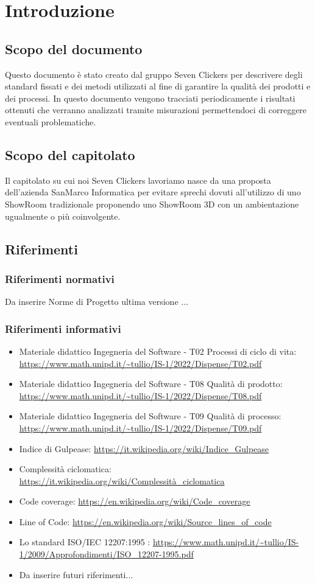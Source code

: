 \section{Introduzione}
\subsection{Scopo del documento}
Questo documento è stato creato dal gruppo Seven Clickers per descrivere degli standard fissati e dei metodi utilizzati al fine di garantire la qualità dei prodotti e dei processi.
In questo documento vengono tracciati periodicamente i risultati ottenuti che verranno analizzati tramite misurazioni permettendoci di correggere eventuali problematiche.

\subsection{Scopo del capitolato}
Il capitolato su cui noi Seven Clickers lavoriamo nasce da una proposta dell'azienda SanMarco Informatica per evitare sprechi dovuti all'utilizzo di uno ShowRoom tradizionale proponendo uno ShowRoom 3D con un ambientazione ugualmente o più coinvolgente.

\subsection{Riferimenti}
\subsubsection{Riferimenti normativi}
Da inserire Norme di Progetto ultima versione ...

\subsubsection{Riferimenti informativi}
\begin{itemize}
	\item Materiale didattico Ingegneria del Software - T02 Processi di ciclo di vita: \url{https://www.math.unipd.it/~tullio/IS-1/2022/Dispense/T02.pdf}
	\item Materiale didattico Ingegneria del Software - T08 Qualità di prodotto: \url{https://www.math.unipd.it/~tullio/IS-1/2022/Dispense/T08.pdf}
	\item Materiale didattico Ingegneria del Software - T09 Qualità di processo: \url{https://www.math.unipd.it/~tullio/IS-1/2022/Dispense/T09.pdf}
	\item Indice di Gulpease: \url{https://it.wikipedia.org/wiki/Indice_Gulpease}
	\item Complessità ciclomatica: \url{https://it.wikipedia.org/wiki/Complessità_ciclomatica}
	\item Code coverage: \url{https://en.wikipedia.org/wiki/Code_coverage}
	\item Line of Code: \url{https://en.wikipedia.org/wiki/Source_lines_of_code}	
	\item Lo standard ISO/IEC 12207:1995 : \url{https://www.math.unipd.it/~tullio/IS-1/2009/Approfondimenti/ISO_12207-1995.pdf}
	\item Da inserire futuri riferimenti...
\end{itemize}

